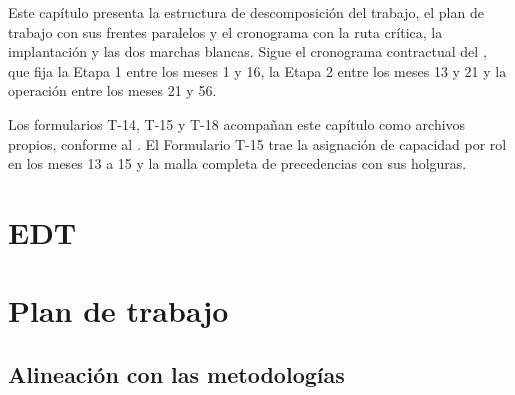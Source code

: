 %

Este capítulo presenta la estructura de descomposición del trabajo, el plan de trabajo con sus
frentes paralelos y el cronograma con la ruta crítica, la implantación y las dos marchas blancas.
Sigue el cronograma contractual del , que fija la Etapa 1 entre los meses 1 y 16, la
Etapa 2 entre los meses 13 y 21 y la operación entre los meses 21 y 56.

Los formularios T-14, T-15 y T-18 acompañan este capítulo como archivos propios, conforme al
. El Formulario T-15 trae la asignación de capacidad por rol en los meses
13 a 15 y la malla completa de precedencias con sus holguras.

\section{EDT}\label{sec:7-edt}


\section{Plan de trabajo}\label{sec:7-plan}


\subsection{Alineación con las metodologías}\label{sec:7-alineacion}

